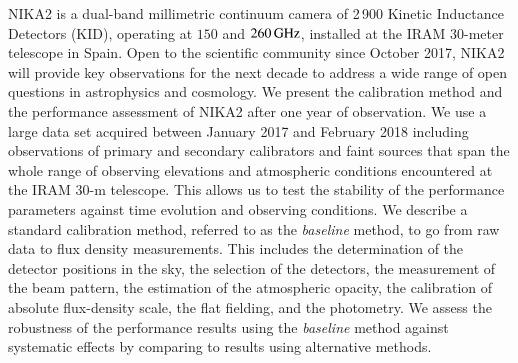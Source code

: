 \documentclass[traditionalabstract]{aa}
\newcommand{\lp}[1]{#1}
\begin{document}
   \date{Received July 2, 2019; Accepted XXXX XX, 2019}
   \abstract
       {%
         NIKA2 is a dual-band millimetric continuum
         camera of 2\,900 Kinetic Inductance Detectors (KID),
         operating at $150$ and $260\,\rm{GHz}$, installed at the IRAM 30-meter
         telescope %
          in Spain.
         Open to the scientific community since October 2017, NIKA2 
         will provide key observations for the next decade to 
         address a wide range of open questions in astrophysics and
         cosmology.}
       {We present {\lp the calibration method} and the performance assessment of NIKA2 after one year of observation.}
       {We use a large data set acquired between January 2017 and
         February 2018 including observations of primary and secondary
         calibrators and faint sources that span the whole range
         of observing elevations and atmospheric conditions encountered at the
         IRAM 30-m telescope. This allows us to test the stability of the
         performance parameters against time evolution and
         observing conditions. {\lp We describe a standard calibration
         method, referred to as the \emph{baseline} method, to go from
         raw data to flux density measurements. This includes the
         determination of the detector positions in the sky, the
         selection of the detectors, the measurement of
         the beam pattern, the estimation of the 
         atmospheric opacity, the calibration of absolute flux-density
         scale, the flat fielding, and the photometry. We
         assess the robustness of the performance results using the
         \emph{baseline} method against systematic effects by
         comparing to results using alternative methods.}  
       }
\end{document}
